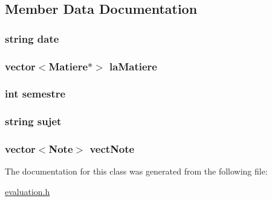 \subsection{Member Data Documentation}
\hypertarget{classEvaluation_a988e6c0d8b2a9807e4271ed921cd529b}{
\subsubsection[{date}]{\setlength{\rightskip}{0pt plus 5cm}string date\hspace{0.3cm}{\ttfamily [private]}}}\label{classEvaluation_a988e6c0d8b2a9807e4271ed921cd529b}
\hypertarget{classEvaluation_a17d4cb8a38684cf2682bb177c07d70bc}{
\subsubsection[{la\+Matiere}]{\setlength{\rightskip}{0pt plus 5cm}vector$<${\bf Matiere}$\ast$$>$ la\+Matiere\hspace{0.3cm}{\ttfamily [private]}}}\label{classEvaluation_a17d4cb8a38684cf2682bb177c07d70bc}
\hypertarget{classEvaluation_a6e249e787cadf640c9d8e9853434ec77}{
\subsubsection[{semestre}]{\setlength{\rightskip}{0pt plus 5cm}int semestre\hspace{0.3cm}{\ttfamily [private]}}}\label{classEvaluation_a6e249e787cadf640c9d8e9853434ec77}
\hypertarget{classEvaluation_a6c6d0d48e47374eac25e10c37b5e29f9}{
\subsubsection[{sujet}]{\setlength{\rightskip}{0pt plus 5cm}string sujet\hspace{0.3cm}{\ttfamily [private]}}}\label{classEvaluation_a6c6d0d48e47374eac25e10c37b5e29f9}
\hypertarget{classEvaluation_a79208e29aac3dc8c7b1f192498cc3a3a}{
\subsubsection[{vect\+Note}]{\setlength{\rightskip}{0pt plus 5cm}vector$<${\bf Note}$>$ vect\+Note\hspace{0.3cm}{\ttfamily [private]}}}\label{classEvaluation_a79208e29aac3dc8c7b1f192498cc3a3a}


The documentation for this class was generated from the following file\+:\begin{DoxyCompactItemize}
\item 
\hyperlink{evaluation_8h}{evaluation.\+h}\end{DoxyCompactItemize}
